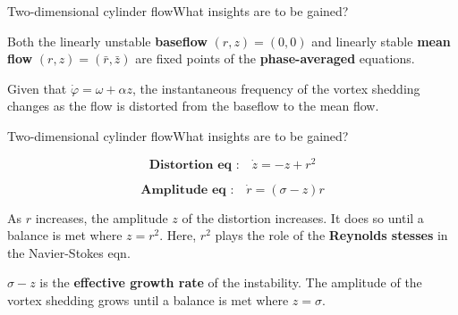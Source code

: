 \documentclass[usenames,dvipsnames,svgnames,10pt,aspectratio=169]{beamer}
\begin{document}
\begin{frame}[t, c]{Two-dimensional cylinder flow}{What insights are to be gained?}
  \begin{minipage}{.68\textwidth}
    Both the linearly unstable \alert{\textbf{baseflow}} \( (r, z) = (0, 0) \) and linearly stable \alert{\textbf{mean flow}} \( (r, z) = (\bar{r}, \bar{z}) \) are fixed points of the \alert{\textbf{phase-averaged}} equations.

    \bigskip

    Given that $\dot{\varphi} = \omega + \alpha z$, the instantaneous frequency of the vortex shedding changes as the flow is distorted from the baseflow to the mean flow.
  \end{minipage}%
  \hfill
  \begin{minipage}{.28\textwidth}

  \end{minipage}
\end{frame}





\begin{frame}[t, c]{Two-dimensional cylinder flow}{What insights are to be gained?}
  \begin{minipage}{.48\textwidth}
    \[
    \textbf{Distortion eq :} \quad \dot{z} = -z + r^2
    \]
  \end{minipage}%
  \hfill
  \begin{minipage}{.48\textwidth}
    \[
    \textbf{Amplitude eq :} \quad \dot{r} = \left( \sigma - z \right) r
    \]
  \end{minipage}

  \bigskip

  \begin{minipage}{.48\textwidth}
    As $r$ increases, the amplitude $z$ of the distortion increases.
    It does so until a balance is met where $z = r^2$.
    Here, $r^2$ plays the role of the \alert{\textbf{Reynolds stesses}} in the Navier-Stokes eqn.
  \end{minipage}%
  \hfill
  \begin{minipage}{.48\textwidth}
    $\sigma - z$ is the \alert{\textbf{effective growth rate}} of the instability.
    The amplitude of the vortex shedding grows until a balance is met where $z = \sigma$.
    \vspace{0.5cm}
  \end{minipage}

\end{frame}
\end{document}
